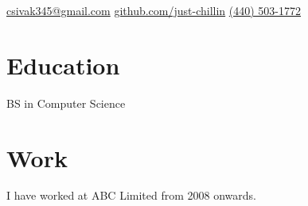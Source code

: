 \documentclass{cv}
\begin{document}
	
	\contact
		{\faEnvelopeSquare\space\href{mailto:csivak345@gmail.com}{csivak345@gmail.com}}
		{\faGithub\space\url{github.com/just-chillin}}
		{\faPhone\space\href{tel:14405031772}{(440) 503-1772}}
	
	\section{Education}
	BS in Computer Science
	
	\section{Work}
	I have worked at ABC Limited from 2008 onwards.
	
\end{document}
